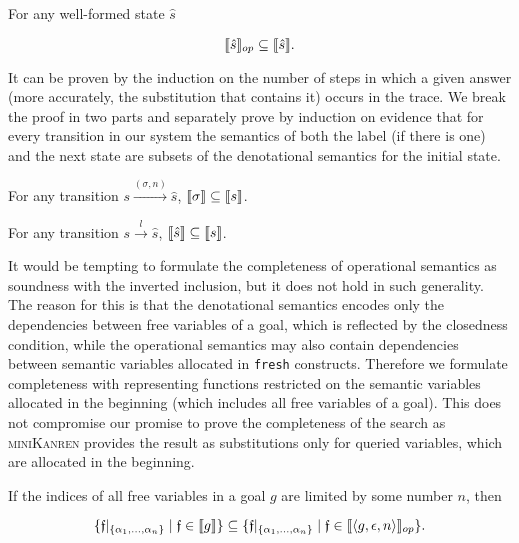 \begin{lemma}
\label{lem:gen_soundness}
For any well-formed state $\hat{s}$

\[
\llbracket{\hat{s}}\rrbracket_{op} \subseteq \llbracket{\hat{s}}\rrbracket.
\]
\end{lemma}

It can be proven by the induction on the number of steps in which a given answer (more accurately, the substitution that contains it) occurs in the trace.
We break the proof in two parts and separately prove by induction on evidence that for every transition in our system the semantics of both the label (if there is one)
and the next state are subsets of the denotational semantics for the initial state.

\begin{lemma}
\label{lem:answer_soundness}
For any transition $s \xrightarrow{(\sigma, n)} \hat{s}$, \mbox{$\llbracket{\sigma}\rrbracket \subseteq \llbracket{s}\rrbracket$}.
\end{lemma}

\begin{lemma}
\label{lem:next_state_soundness}
For any transition $s \xrightarrow{l} \hat{s}$, \mbox{$\llbracket{\hat{s}}\rrbracket \subseteq \llbracket{s}\rrbracket$}.
\end{lemma}

It would be tempting to formulate the completeness of operational semantics as soundness with the inverted inclusion, but it does not hold in such generality.
The reason for this is that the denotational semantics encodes only the dependencies between free variables of a goal, which is reflected by the closedness condition,
while the operational semantics may also contain dependencies between semantic variables allocated in \lstinline|fresh| constructs. Therefore we formulate completeness
with representing functions restricted on the semantic variables allocated in the beginning (which includes all free variables of a goal). This does not
compromise our promise to prove the completeness of the search as \textsc{miniKanren} provides the result as substitutions only for queried variables,
which are allocated in the beginning.

\begin{theorem}
If the indices of all free variables in a goal $g$ are limited by some number $n$, then

\[
\{\mathfrak{f}|_{\{\alpha_1,\dots,\alpha_n\}} \mid \mathfrak{f} \in \llbracket{g}\rrbracket\} \subseteq \{\mathfrak{f}|_{\{\alpha_1,\dots,\alpha_n\}} \mid \mathfrak{f} \in \llbracket{\left<{g, \epsilon, n}\right>}\rrbracket_{op}\}.
\]
\end{theorem}

